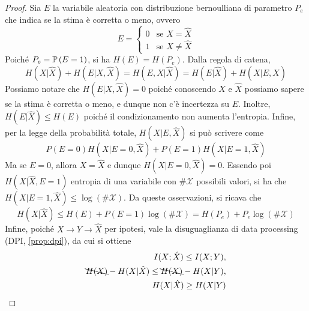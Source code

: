 \begin{proof}
  Sia \(E\) la variabile aleatoria con distribuzione bernoulliana di parametro \(P_e\) che indica se la stima è corretta o meno, ovvero
  \[E = \begin{cases}
    0 & \text{se } X = \hat{X} \\
    1 & \text{se } X \neq \hat{X}
  \end{cases}\]
  Poiché \(P_e=\Prob[E=1]\), si ha \(H(E) = H(P_e)\). 
  Dalla regola di catena,
  \[H(X|\hat{X})+H(E|X,\hat{X})=H(E,X|\hat{X}) = H(E|\hat{X}) + H(X|E,\hat{X})\]
  Possiamo notare che \(H(E|X,\hat{X})=0\) poiché conoscendo \(X\) e \(\hat{X}\) possiamo sapere se la stima è corretta o meno, e dunque non c'è incertezza su \(E\).
  Inoltre, \(H(E|\hat{X}) \leq H(E) \) poiché il condizionamento non aumenta l'entropia. 
  Infine, per la legge della probabilità totale, \(H(X|E,\hat{X})\) si può scrivere come
  \[P(E=0)H(X|E=0,\hat{X}) + P(E=1)H(X|E=1,\hat{X})\]
  Ma se \(E=0\), allora \(X=\hat{X}\) e dunque \(H(X|E=0,\hat{X})=0\).
  Essendo poi \(H(X|\hat{X},E=1)\) entropia di una variabile con \(\#\mathcal{X}\) possibili valori, si ha che \(H(X|E=1,\hat{X}) \leq \log(\#\mathcal{X})\).
  Da queste osservazioni, si ricava che
  \[H(X|\hat{X}) \leq H(E) + P(E=1) \log(\#\mathcal{X}) = H(P_e) + P_e \log(\#\mathcal{X})\]
  Infine, poiché \(X \to Y \to \hat{X}\) per ipotesi, vale la disuguaglianza di data processing (DPI, \ref{prop:dpi}), da cui si ottiene 
  \begin{equation*}
    \begin{aligned}
      I(X;\hat{X}) \leq I(X;Y), \\
      \bcancel{H(X)} - H(X|\hat{X}) \leq \bcancel{H(X)} - H(X|Y), \\
      H(X|\hat{X}) \geq H(X|Y)
    \end{aligned}
  \end{equation*}
\end{proof}

